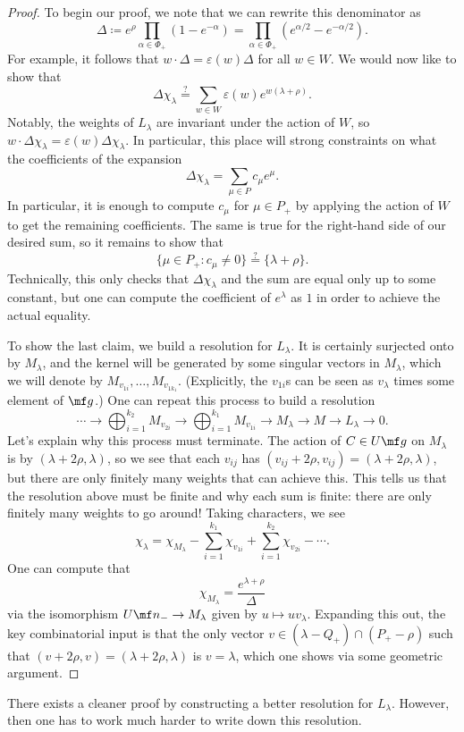 \documentclass[../notes.tex]{subfiles}
\begin{document}
\begin{proof}
	To begin our proof, we note that we can rewrite this denominator as
	\[\Delta\coloneqq e^\rho\prod_{\alpha\in\Phi_+}\left(1-e^{-\alpha}\right)=\prod_{\alpha\in\Phi_+}\left(e^{\alpha/2}-e^{-\alpha/2}\right).\]
	For example, it follows that $w\cdot\Delta=\varepsilon(w)\Delta$ for all $w\in W$. We would now like to show that
	\[\Delta\chi_\lambda\stackrel?=\sum_{w\in W}\varepsilon(w)e^{w(\lambda+\rho)}.\]
	Notably, the weights of $L_\lambda$ are invariant under the action of $W$, so $w\cdot\Delta\chi_\lambda=\varepsilon(w)\Delta\chi_\lambda$. In particular, this place will strong constraints on what the coefficients of the expansion
	\[\Delta\chi_\lambda=\sum_{\mu\in P}c_\mu e^\mu.\]
	In particular, it is enough to compute $c_\mu$ for $\mu\in P_+$ by applying the action of $W$ to get the remaining coefficients. The same is true for the right-hand side of our desired sum, so it remains to show that
	\[\{\mu\in P_+:c_\mu\ne0\}\stackrel?=\{\lambda+\rho\}.\]
	Technically, this only checks that $\Delta\chi_\lambda$ and the sum are equal only up to some constant, but one can compute the coefficient of $e^\lambda$ as $1$ in order to achieve the actual equality.
	
	To show the last claim, we build a resolution for $L_\lambda$. It is certainly surjected onto by $M_\lambda$, and the kernel will be generated by some singular vectors in $M_\lambda$, which we will denote by $M_{v_{1i}},\ldots,M_{v_{1k_1}}$. (Explicitly, the $v_{1i}$s can be seen as $v_\lambda$ times some element of $\mf g$.) One can repeat this process to build a resolution
	\[\cdots\to\bigoplus_{i=1}^{k_2}M_{v_{2i}}\to\bigoplus_{i=1}^{k_1}M_{v_{1i}}\to M_\lambda\to M\to L_\lambda\to0.\]
	Let's explain why this process must terminate. The action of $C\in U\mf g$ on $M_\lambda$ is by $(\lambda+2\rho,\lambda)$, so we see that each $v_{ij}$ has $(v_{ij}+2\rho,v_{ij})=(\lambda+2\rho,\lambda)$, but there are only finitely many weights that can achieve this. This tells us that the resolution above must be finite and why each sum is finite: there are only finitely many weights to go around! Taking characters, we see
	\[\chi_\lambda=\chi_{M_\lambda}-\sum_{i=1}^{k_1}\chi_{v_{1i}}+\sum_{i=1}^{k_2}\chi_{v_{2i}}-\cdots.\]
	One can compute that
	\[\chi_{M_\lambda}=\frac{e^{\lambda+\rho}}{\Delta}\]
	via the isomorphism $U\mf n_-\to M_\lambda$ given by $u\mapsto uv_\lambda$. Expanding this out, the key combinatorial input is that the only vector $v\in (\lambda-Q_+)\cap(P_+-\rho)$ such that $(v+2\rho,v)=(\lambda+2\rho,\lambda)$ is $v=\lambda$, which one shows via some geometric argument.
\end{proof}
\begin{remark}
	There exists a cleaner proof by constructing a better resolution for $L_\lambda$. However, then one has to work much harder to write down this resolution.
\end{remark}
\end{document}
